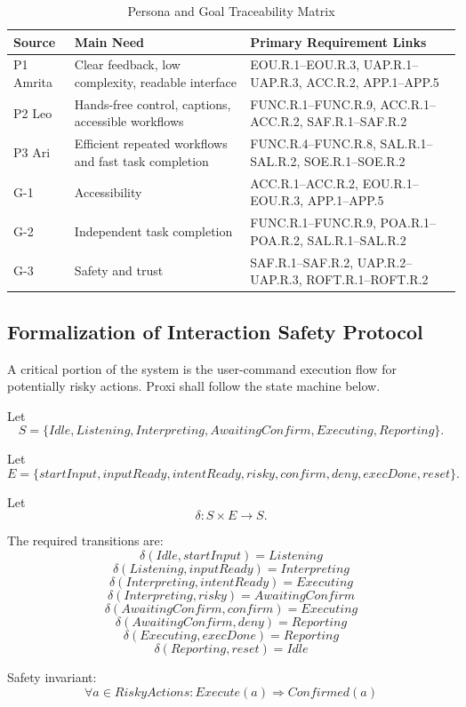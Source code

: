 \documentclass[12pt]{article}
\begin{document}
\begin{table}[H]
\centering
\caption{Persona and Goal Traceability Matrix}
\label{tab:persona-traceability}
\begin{tabularx}{\textwidth}{p{2cm}p{4.6cm}X}
\toprule
\textbf{Source} & \textbf{Main Need} &
\textbf{Primary Requirement Links} \\
\midrule
P1 Amrita &
Clear feedback, low complexity, readable interface &
EOU.R.1--EOU.R.3, UAP.R.1--UAP.R.3, ACC.R.2,
APP.1--APP.5 \\
P2 Leo &
Hands-free control, captions, accessible workflows &
FUNC.R.1--FUNC.R.9, ACC.R.1--ACC.R.2,
SAF.R.1--SAF.R.2 \\
P3 Ari &
Efficient repeated workflows and fast task completion &
FUNC.R.4--FUNC.R.8, SAL.R.1--SAL.R.2,
SOE.R.1--SOE.R.2 \\
G-1 &
Accessibility &
ACC.R.1--ACC.R.2, EOU.R.1--EOU.R.3,
APP.1--APP.5 \\
G-2 &
Independent task completion &
FUNC.R.1--FUNC.R.9, POA.R.1--POA.R.2,
SAL.R.1--SAL.R.2 \\
G-3 &
Safety and trust &
SAF.R.1--SAF.R.2, UAP.R.2--UAP.R.3,
ROFT.R.1--ROFT.R.2 \\
\bottomrule
\end{tabularx}
\end{table}

\subsection{Formalization of Interaction Safety Protocol}
A critical portion of the system is the user-command execution flow for
potentially risky actions. Proxi shall follow the state machine below.

Let
\[
S =
\{ Idle, Listening, Interpreting, AwaitingConfirm, Executing, Reporting
\}.
\]

Let
\[
E =
\{ startInput, inputReady, intentReady, risky, confirm, deny,
execDone, reset \}.
\]

Let
\[
\delta : S \times E \rightarrow S.
\]

The required transitions are:
\[
\delta(Idle, startInput) = Listening
\]
\[
\delta(Listening, inputReady) = Interpreting
\]
\[
\delta(Interpreting, intentReady) = Executing
\]
\[
\delta(Interpreting, risky) = AwaitingConfirm
\]
\[
\delta(AwaitingConfirm, confirm) = Executing
\]
\[
\delta(AwaitingConfirm, deny) = Reporting
\]
\[
\delta(Executing, execDone) = Reporting
\]
\[
\delta(Reporting, reset) = Idle
\]

Safety invariant:
\[
\forall a \in RiskyActions :
Execute(a) \Rightarrow Confirmed(a)
\]
\end{document}
